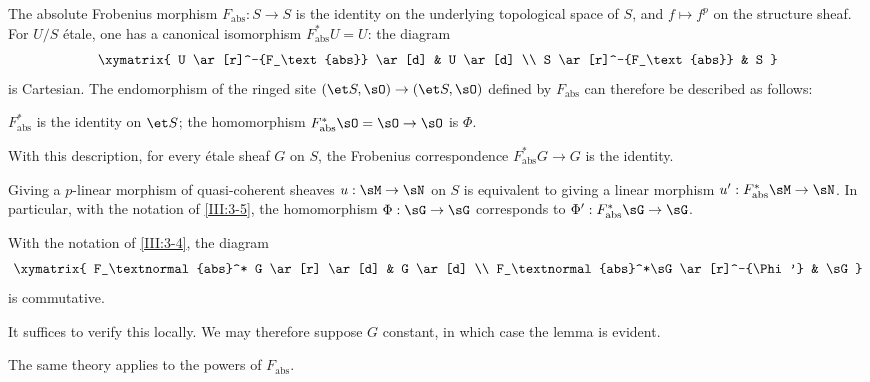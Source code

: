 The absolute Frobenius morphism $F_\text{abs}:S\to S$ is the identity on the
underlying topological space of $S$, and $f\mapsto f^p$ on the structure
sheaf. For $U/S$ étale, one has a canonical isomorphism
$F_\text{abs}^* U=U$: the diagram
\[\xymatrix{
  U \ar[r]^-{F_\text{abs}} \ar[d]
    & U \ar[d] \\
  S \ar[r]^-{F_\text{abs}}
    & S
}\]
is Cartesian. The endomorphism of the ringed site
$(\et S,\sO)\to(\et S,\sO)$ defined by $F_\text{abs}$ can
therefore be described as follows:
\begin{center}
  $F_\text{abs}^*$ is the identity on $\et S$; the homomorphism
  $F_\text{abs}^*\sO=\sO\to\sO$ is $\Phi$.
\end{center}
With this description, for every étale sheaf $G$ on $S$, the Frobenius correspondence $F_\text{abs}^*G\to G$ is the identity.

Giving a $p$-linear morphism of quasi-coherent sheaves
$u:\sM\to\sN$ on $S$ is equivalent to giving a linear morphism
$u':F_\text{abs}^*\sM\to\sN$. In particular, with the notation of
\ref{III:3-5}, the homomorphism $\Phi:\sG\to\sG$ corresponds to
$\Phi':F_\text{abs}^*\sG\to\sG$.






\begin{lemma_}\label{III:3-5}
With the notation of \ref{III:3-4}, the diagram
\[\xymatrix{
  F_\textnormal{abs}^* G \ar[r] \ar[d]
    & G \ar[d] \\
  F_\textnormal{abs}^*\sG \ar[r]^-{\Phi'}
    & \sG
}\]
is commutative.
\end{lemma_}

It suffices to verify this locally. We may therefore suppose $G$ constant, in
which case the lemma is evident.

The same theory applies to the powers of $F_\text{abs}$.






\subsection{}\label{III:3-6}

